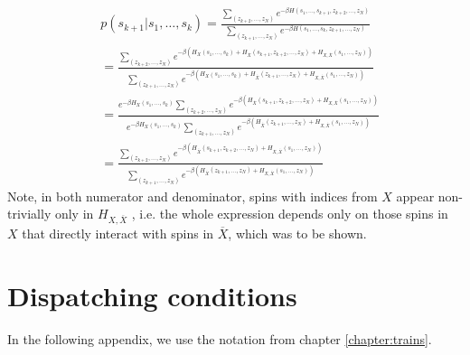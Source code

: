 \begin{align}
   & p(s_{k+1}|s_1, \ldots, s_k) = \frac{\sum\limits_{(z_{k+2}, \ldots, z_N)}e^{-\beta H(s_1, \ldots, s_{k+1}, z_{k+2},\ldots,z_N)}}{\sum\limits_{(z_{k+1}, \ldots, z_N)}e^{-\beta H(s_1, \ldots, s_k, z_{k+1},\ldots,z_N)}}                                                                                                                         \\
   & = \frac{\sum\limits_{(z_{k+2}, \ldots, z_N)}e^{-\beta (H_X(s_1, \ldots, s_k) + H_{\overline{X}}(s_{k+1}, z_{k+2},\ldots,z_N) + H_{X, \overline{X}}(s_1, \ldots, z_N))}}{\sum\limits_{(z_{k+1}, \ldots, z_N)}e^{-\beta (H_X(s_1, \ldots, s_k) + H_{\overline{X}}(z_{k+1}, \ldots,z_N) + H_{X, \overline{X}}(s_1, \ldots, z_N))}}                 \\
   & = \frac{e^{-\beta H_X(s_1, \ldots, s_k)}\sum\limits_{(z_{k+2}, \ldots, z_N)} e^{-\beta(H_{\overline{X}}(s_{k+1}, z_{k+2},\ldots,z_N) + H_{X, \overline{X}}(s_1, \ldots, z_N))}}{e^{-\beta H_X(s_1, \ldots, s_k)}\sum\limits_{(z_{k+1}, \ldots, z_N)}e^{ -\beta(H_{\overline{X}}(z_{k+1}, \ldots,z_N) + H_{X, \overline{X}}(s_1, \ldots, z_N))}} \\
   & = \frac{\sum\limits_{(z_{k+2}, \ldots, z_N)} e^{-\beta(H_{\overline{X}}(s_{k+1}, z_{k+2},\ldots,z_N) + H_{X, \overline{X}}(s_1, \ldots, z_N))}}{\sum\limits_{(z_{k+1}, \ldots, z_N)}e^{ -\beta(H_{\overline{X}}(z_{k+1}, \ldots,z_N) + H_{X, \overline{X}}(s_1, \ldots, z_N))}}
\end{align}
Note, in both numerator and denominator, spins with indices from $X$ appear
non-trivially only in $H_{X, \overline{X}}$ , i.e. the whole expression depends
only on those spins in $X$ that directly interact with spins in $\overline{X}$,
which was to be shown.

\chapter{Dispatching conditions}
\label{chapter:dispatching}
In the following appendix, we use the notation from chapter \ref{chapter:trains}.
